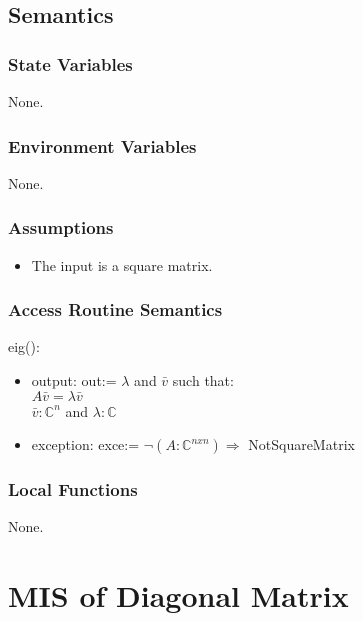\documentclass[12pt, titlepage]{article}
\begin{document}
\subsection{Semantics}

\subsubsection{State Variables}

None.

\subsubsection{Environment Variables}

None.

\subsubsection{Assumptions}

\begin{itemize}
	\item The input is a square matrix. 
\end{itemize}

\subsubsection{Access Routine Semantics}

\noindent eig():
\begin{itemize}
	\item output: out:= $\lambda$ and $\bar{v}$ such that:\\
	$A\bar{v} = \lambda \bar{v}$ \\
	$\bar{v} : \mathbb{C}^{n}$ and $\lambda : \mathbb{C}$
	\item exception: exce:= $ \neg (A : \mathbb{C}^{nxn}) \Rightarrow$ 
	NotSquareMatrix 
\end{itemize}

\subsubsection{Local Functions} 

None. 

\newpage

\section{MIS of Diagonal Matrix} \label{MDM}
\end{document}

